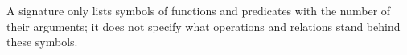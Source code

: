 

\setcounter{section}{1}
\setcounter{subsection}{4}
\setcounter{dfn}{10}

A signature only lists symbols of functions and predicates with the number of their arguments;
it does not specify what operations and relations stand behind these symbols.



